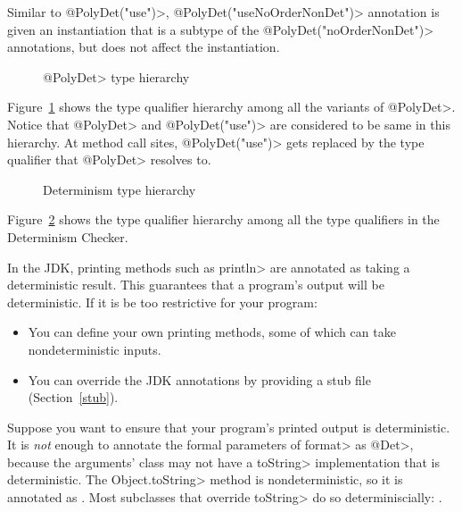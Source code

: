 Similar to \<@PolyDet("use")>, \<@PolyDet("useNoOrderNonDet")>
annotation is given an instantiation that is a subtype of the
\<@PolyDet("noOrderNonDet")> annotations, but does not affect the instantiation.

\begin{figure}
    \begin{center}
    \end{center}
    \caption{\<@PolyDet> type hierarchy}
    \label{fig-determinism-poly-hierarchy}
\end{figure}
Figure~\ref{fig-determinism-poly-hierarchy} shows the type qualifier hierarchy among all the
variants of \<@PolyDet>. Notice that \<@PolyDet> and \<@PolyDet("use")> are considered
to be same in this hierarchy.
At method call sites, \<@PolyDet("use")> gets replaced by the type qualifier that \<@PolyDet>
resolves to.

\begin{figure}
    \begin{center}
    \end{center}
    \caption{Determinism type hierarchy}
    \label{fig-determinism-all-hierarchy}
\end{figure}
Figure~\ref{fig-determinism-all-hierarchy} shows the type qualifier hierarchy among all the
type qualifiers in the Determinism Checker.


In the JDK, printing methods such as \<println> are annotated as taking a
deterministic result.  This guarantees that a program's output will be
deterministic.  If it is be too restrictive for your program:
\begin{itemize}
\item
  You can define your own printing methods, some of which can take
  nondeterministic inputs.
\item
  You can override the JDK annotations by providing a stub file
  (Section~\ref{stub}).
\end{itemize}



Suppose you want to ensure that your program's printed output is
deterministic.
It is \emph{not} enough to annotate the formal parameters of \<format> as
\<@Det>, because the arguments' class may not have a \<toString> implementation that is deterministic.
The \<Object.toString> method is nondeterministic, so it is annotated as
.  Most subclasses
that override \<toString> do so determiniscially:
.

